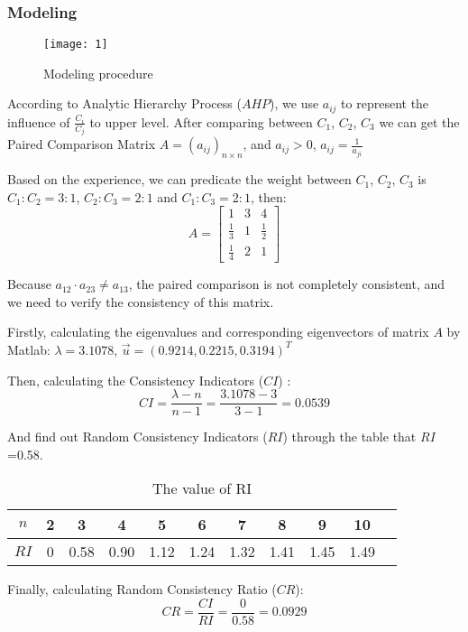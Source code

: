 \documentclass{mcmthesis}
\begin{document}
\subsubsection{Modeling}
\begin{figure}[!ht]
  \centering
  \texttt{[image: 1]}
  \caption{Modeling procedure}
  \label{Modeling procedure}
\end{figure}

According to Analytic Hierarchy Process ($AHP$), we use $a_{ij}$ to represent the influence of $\frac{C_i}{C_j}$ to upper level. After comparing between $C_1$, $C_2$, $C_3$ we can get the Paired Comparison Matrix $A=(a_{ij})_{n\times n}$, and $a_{ij} > 0$, $a_{ij} = \frac{1}{a_{ji}}$

Based on the experience, we can predicate the weight between $C_1$, $C_2$, $C_3$ is $C_1 \colon C_2 = 3 \colon 1 $, $C_2 \colon C_3 = 2 \colon 1 $ and $C_1 \colon C_3 = 2 \colon 1 $, then:
$$A =
 \left[
 \begin{matrix}
   1 & 3 & 4 \\
   \frac{1}{3} & 1 & \frac{1}{2} \\
   \frac{1}{4} & 2 & 1
  \end{matrix}
  \right]
$$

Because $a_{12} \cdot a_{23} \not= a_{13}$, the paired comparison is not completely consistent, and we need to verify the consistency of this matrix.

Firstly, calculating the eigenvalues and corresponding eigenvectors of matrix $A$ by Matlab: $\lambda = 3.1078$, $\vec u = (0.9214, 0.2215, 0.3194)^T$

Then, calculating the Consistency Indicators ($CI$) :
$$CI = \frac{\lambda-n}{n-1} = \frac{3.1078-3}{3-1} = 0.0539$$


And find out Random Consistency Indicators ($RI$) through the table that $RI$=0.58.

\begin{table}[!ht]
  \centering
  \begin{tabular}{ c | c | c | c | c | c | c | c | c | c | c }
    \hline
    $n$ & 2 & 3 & 4 & 5 & 6 & 7 & 8 & 9 & 10 \\ \hline
    $RI$ & 0 & 0.58 & 0.90 & 1.12 & 1.24 & 1.32 & 1.41 & 1.45 & 1.49  \\ \hline
  \end{tabular}
  \caption{The value of RI}
  \label{RI}
\end{table}

Finally, calculating Random Consistency Ratio ($CR$):
$$CR = \frac{CI}{RI} = \frac{0}{0.58} = 0.0929$$
\end{document}
